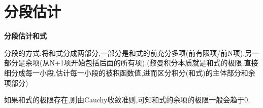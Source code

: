 \documentclass[../../main.tex]{subfiles}
\begin{document}
\section{分段估计}

\begin{conclusion}
\textbf{分段估计和式}

分段的方式:将和式分成两部分,一部分是和式的前充分多项(前有限项/前N项),另一部分是余项(从N+1项开始包括后面的所有项).(黎曼积分本质就是和式的极限,直接细分成每一小段,估计每一小段的被积函数值,进而区分积分(和式)的主体部分和余项部分)
\end{conclusion}
\begin{note}
如果和式的极限存在,则由Cauchy收敛准则,可知和式的余项的极限一般会趋于0.
\end{note}
\end{document}
